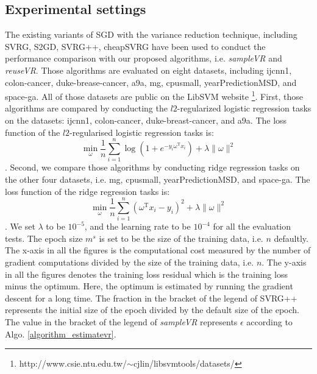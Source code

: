 \documentclass[letterpaper]{article}
\begin{document}

\subsection{Experimental settings}
\label{sect_experimental_settings}
The existing variants of SGD with the variance reduction technique, including SVRG, S2GD, SVRG++, cheapSVRG have been used to conduct the performance comparison with our proposed algorithms, i.e. \emph{sampleVR} and \emph{reuseVR}. Those algorithms are evaluated on eight datasets, including ijcnn1, colon-cancer, duke-brease-cancer, a9a, mg, cpusmall, yearPredictionMSD, and space-ga. All of those datasets are public on the LibSVM website \footnote{http://www.csie.ntu.edu.tw/$\sim$cjlin/libsvmtools/datasets/}. First, those algorithms are compared by conducting the $l2$-regularized logistic regression tasks on the datasets: ijcnn1, colon-cancer, duke-breast-cancer, and a9a. The loss function of the $l2$-regularised logistic regression tasks is:
\begin{equation}
\label{standard_sgd}
\min\limits_\omega \frac{1}{n}\sum\limits_{i=1}^n \log(1+e^{-y_i \omega^\mathrm{T} x_i }) + \lambda \parallel \omega \parallel^2
\end{equation}. Second, we compare those algorithms by conducting ridge regression tasks on the other four datasets, i.e. mg, cpusmall, yearPredictionMSD, and space-ga. The loss function of the ridge regression tasks is:
\begin{equation}
\label{standard_sgd}
\min\limits_\omega \frac{1}{n}\sum\limits_{i=1}^n\left(\omega^{\mathrm{T}}x_i-y_i\right)^2 + \lambda \parallel \omega \parallel^2
\end{equation}. We set $\lambda$ to be $10^{-5}$, and the learning rate to be $10^{-4}$ for all the evaluation tests. The epoch size $m^s$ is set to be the size of the training data, i.e. $n$ defaultly.  The x-axis in all the figures  is the computational cost measured by the number of gradient computations divided by  the size of the training data, i.e. $n$. The y-axis in all the figures denotes the training loss residual which is the training loss minus the optimum. Here, the optimum is estimated by running the gradient descent for a long time. The fraction in the bracket of the legend of SVRG++ represents the initial size of the epoch divided by the default size of the epoch. The value in the bracket of the legend of \emph{sampleVR} represents $\epsilon$ according to Algo. \ref{algorithm_estimatevr}.
\end{document}
